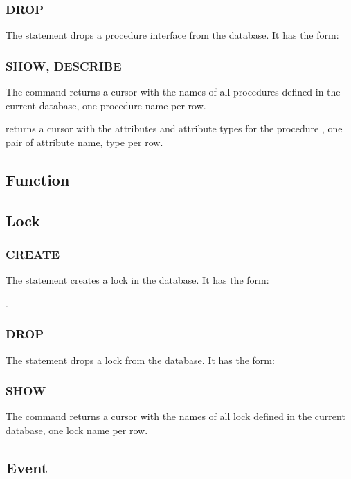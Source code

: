 \subsubsection{DROP}
The  statement
drops a procedure interface from the database.
It has the form:

 

\subsubsection{SHOW, DESCRIBE}
The command 
returns a cursor with the names of all
procedures
defined in the current database,
one procedure name per row.

 
returns a cursor with the attributes
and attribute types for the procedure
, one pair of
attribute name, type per row.

\subsection{Function}

\subsection{Lock}
\subsubsection{CREATE}
The  statement
creates a lock in the database.
It has the form:

 .

\subsubsection{DROP}
The  statement
drops a lock from the database.
It has the form:

 

\subsubsection{SHOW}
The command 
returns a cursor with the names of all
lock
defined in the current database,
one lock name per row.

\subsection{Event}

